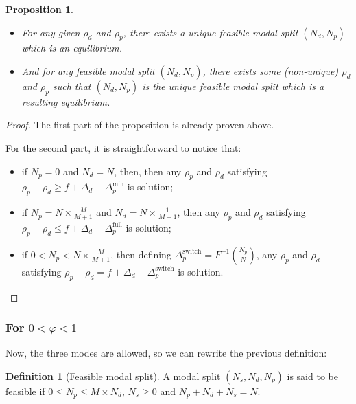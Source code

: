 \documentclass[english, a4paper]{article}
\theoremstyle{plain}
\newtheorem{prop}{Proposition}
\theoremstyle{definition}
\newtheorem{definition}{Definition}
\theoremstyle{remark}
\begin{document}
\begin{prop}
    \begin{itemize}
        \item For any given $\rho_d$ and $\rho_p$, there exists a unique feasible modal split $(N_d, N_p)$ which is an equilibrium.
    
        \item And for any feasible modal split $(N_d, N_p)$, there exists some (non-unique) $\rho _d$ and $\rho _p$ such that $(N_d, N_p)$ is the unique feasible modal split which is a resulting equilibrium.
    \end{itemize}
\end{prop}

\begin{proof}
    The first part of the proposition is already proven above.

    For the second part, it is straightforward to notice that:
    \begin{itemize}
        \item if $N_p = 0$ and $N_d = N$, then, then any $\rho _p$ and $\rho _d$ satisfying $\rho _p - \rho _d \geq f + \Delta _d - \Delta _p^{\text{min}}$ is solution;
        \item if $N_p = N \times \frac{M}{M+ 1}$ and $N_d = N \times \frac{1}{M+ 1}$, then any $\rho _p$ and $\rho _d$ satisfying $\rho _p - \rho _d \leq f + \Delta _d - \Delta _p^{\text{full}}$ is solution;
        \item if $0 < N_p < N \times \frac{M}{M+1}$, then defining $\Delta _p^{\text{switch}} = F^{-1}\left(\frac{N _p}{N} \right)$, any $\rho _p$ and $\rho _d$ satisfying $\rho _p - \rho _d = f + \Delta _d - \Delta _p^{\text{switch}}$ is solution.
    \end{itemize}
    
\end{proof} 

\subsubsection{For $0 < \varphi < 1$}

Now, the three modes are allowed, so we can rewrite the previous definition:

\begin{definition}[Feasible modal split]
    A modal split $(N_s, N_d, N_p)$ is said to be feasible if $0 \leq N_p \leq M \times N_d$, $N_s \geq 0$ and $N_p + N_d + N_s = N$.    
\end{definition}
\end{document}
